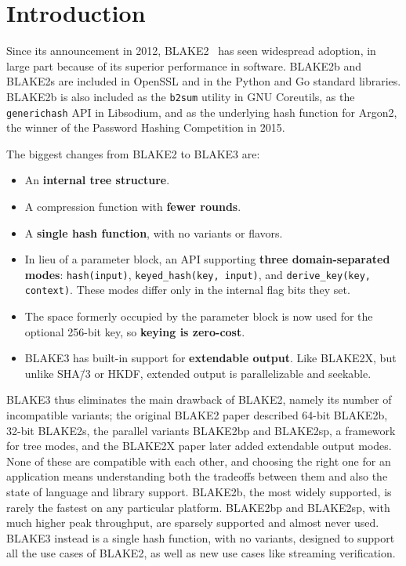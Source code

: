 \documentclass[11pt,notitlepage,a4paper]{article}
\begin{document}
\newpage

\section{Introduction}\label{sec:intro}

Since its announcement in 2012, BLAKE2~\cite{DBLP:conf/acns/AumassonNWW13} has 
seen widespread adoption, in large
part because of its superior performance in software. 
BLAKE2b and BLAKE2s are included in OpenSSL and in the Python and Go
standard libraries. 
BLAKE2b is also included as the \texttt{b2sum} utility in GNU Coreutils,
as the \texttt{generichash} API in Libsodium, and as the underlying hash function for
Argon2, the winner of the Password Hashing Competition in 2015.

The biggest changes from BLAKE2 to BLAKE3 are:

\begin{itemize}
    \item An \textbf{internal tree structure}.
    \item A compression function with \textbf{fewer rounds}.
    \item A \textbf{single hash function}, with no variants or flavors.
    \item In lieu of a parameter block, an API supporting \textbf{three
        domain-separated modes}: \texttt{hash(input)},
        \texttt{keyed\_hash(key, input)}, and \texttt{derive\_key(key,
        context)}. These modes differ only in the internal flag bits they set.
    \item The space formerly occupied by the parameter block is now used for
        the optional 256-bit key, so \textbf{keying is zero-cost}.
    \item BLAKE3 has built-in support for \textbf{extendable output}. Like
        BLAKE2X, but unlike SHA\=/3 or HKDF, extended output is parallelizable
        and seekable.
\end{itemize}

BLAKE3 thus eliminates the main drawback of BLAKE2, namely its number of
incompatible variants;
the original BLAKE2 paper described 64-bit BLAKE2b, 32-bit BLAKE2s, the parallel
variants BLAKE2bp and BLAKE2sp, a framework for tree modes, and the
BLAKE2X paper later added extendable output modes. 
None of these are compatible with each other, and choosing the right one
for an application means understanding both the tradeoffs between them
and also the state of language and library support.  
BLAKE2b, the most widely supported, is rarely the fastest on any
particular platform.
BLAKE2bp and BLAKE2sp, with much higher peak throughput, are sparsely
supported and almost never used.
BLAKE3 instead is a single hash function, with no variants, designed to
support all the use cases of BLAKE2, as well as new use cases like
streaming verification. 
\end{document}
